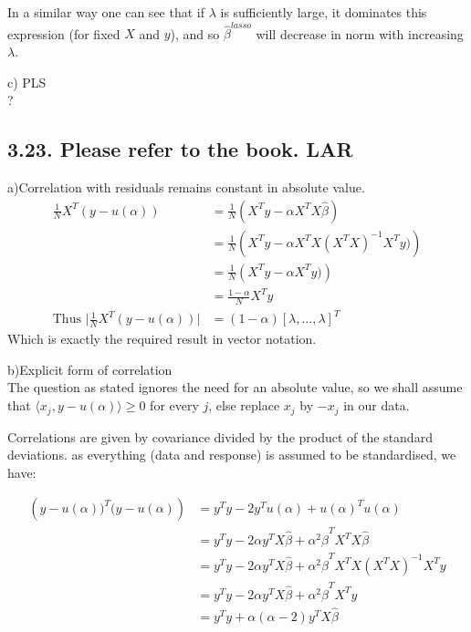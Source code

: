 In a similar way one can see that if $\lambda$ is sufficiently large, it dominates this expression (for fixed $X$ and $y$), and so $\hat{\beta}^{lasso}$ will decrease in norm with increasing $\lambda$.

c) PLS\\

?






\subsection*{3.23. Please refer to the book. LAR}
a)Correlation with residuals remains constant in absolute value.\\

\begin{align*}
    \frac{1}{N} X^T \left(y - u(\alpha)\right) &= \frac{1}{N}\left(X^T y - \alpha X^T X\hat{\beta}\right)\\
    &= \frac{1}{N}\left(X^T y - \alpha X^T X \left(X^T X\right)^{-1} X^T y)\right)\\
    &= \frac{1}{N}\left(X^T y - \alpha X^T y)\right)\\
    &= \frac{1-\alpha}{N}X^T y\\
    \text{Thus }\lvert\frac{1}{N} X^T \left(y - u(\alpha)\right) \rvert &= (1-\alpha) [\lambda,\dots,\lambda]^T
\end{align*}
Which is exactly the required result in vector notation.

b)Explicit form of correlation\\

The question as stated ignores the need for an absolute value, so we shall assume that $\langle x_j, y - u(\alpha)\rangle \geq 0$ for every $j$, else replace $x_j$ by $-x_j$ in our data.

Correlations are given by covariance divided by the product of the standard deviations. as everything (data and response) is assumed to be standardised, we have:

\begin{align*}
    \left(y - u(\alpha))^T (y - u(\alpha)\right) &= 
    y^T y - 2 y^T u(\alpha) + u(\alpha)^T u(\alpha)\\
    &= y^T y - 2\alpha y^T X\hat{\beta} + \alpha^2 \hat{\beta}^T X^T X\hat{\beta}\\
    &= y^T y - 2\alpha y^T X\hat{\beta} + \alpha^2 \hat{\beta}^T X^T X \left(X^TX\right)^{-1} X^T y\\
    &= y^T y - 2\alpha y^T X\hat{\beta} + \alpha^2 \hat{\beta}^T X^T y\\
    &= y^T y + \alpha( \alpha - 2) y^T X\hat{\beta}\\
\end{align*}

